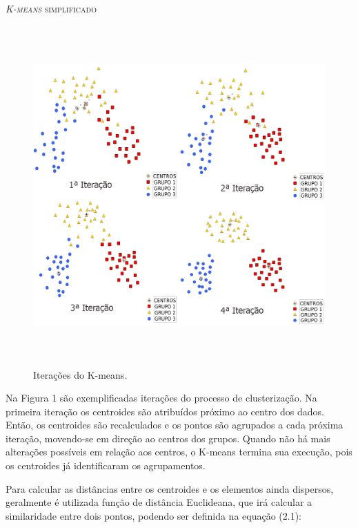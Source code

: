 \begin{algorithm}[H]
\caption{\textsc{\textit{K-means} simplificado}}
\end{algorithm}
\vspace{0.4cm}

\begin{figure}[!h]
\centering
\includegraphics[width = 15cm, height = 13cm]{figuras/kmeans.png}
\caption{\scriptsize{Iterações do K-means.}}
\end{figure}

\indent Na Figura 1 são exemplificadas iterações do processo de clusterização. Na primeira iteração os centroides são atribuídos próximo ao centro dos dados. Então, os centroides são recalculados e os pontos são agrupados a cada próxima iteração, movendo-se em direção ao centros dos grupos. Quando não há mais alterações possíveis em relação aos centros, o K-means termina sua execução, pois os centroides já identificaram os agrupamentos.

\indent Para calcular as distâncias entre os centroides e os elementos ainda dispersos, geralmente é utilizada função de distância Euclideana, que irá calcular a similaridade entre dois pontos, podendo ser definida na equação (2.1):

